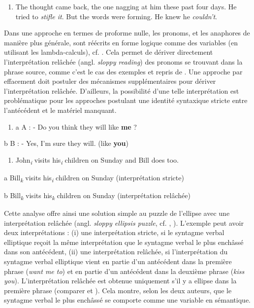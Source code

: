 \begin{enumerate}
\item \label{bkm:Ref305954012}The thought came back, the one nagging at him these past four days. He tried to \textit{stifle it}. But the words were forming. He knew he \textit{couldn't}.  


\end{enumerate}
Dans une approche en termes de proforme nulle, les pronoms, et les anaphores de manière plus générale, sont réécrits en forme logique comme des variables (en utilisant les lambda-calculs), cf. \citet{Williams1977}. Cela permet de dériver directement l'interprétation relâchée (angl. \textit{sloppy reading}) des pronoms se trouvant dans la phrase source, comme c'est le cas des exemples  et  repris de \citet{Winkler2006}. Une approche par effacement doit postuler des mécanismes supplémentaires pour dériver l'interprétation relâchée. D'ailleurs, la possibilité d'une telle interprétation est problématique pour les approches postulant une identité syntaxique stricte entre l'antécédent et le matériel manquant.


\begin{enumerate}
\item \label{bkm:Ref305954986}a  A : - Do you think they will like \textbf{me} ?


\end{enumerate}
  b  B : - Yes, I'm sure they will. (like \textbf{you})  


\begin{enumerate}
\item \label{bkm:Ref305955037}John\textit{\textsubscript{i}} visits his\textit{\textsubscript{i}} children on Sunday and Bill does too.  


\end{enumerate}
a  Bill\textit{\textsubscript{k}} visits his\textit{\textsubscript{i}} children on Sunday (interprétation stricte) 

b    Bill\textit{\textsubscript{k}} visits his\textit{\textsubscript{k}} children on Sunday (interprétation relâchée)

Cette analyse offre ainsi une solution simple au puzzle de l'ellipse avec une interprétation relâchée (angl. \textit{sloppy ellipsis puzzle}, cf. \citet{Hardt1999}, \citet{Schwarz2000}). L'exemple  peut avoir deux interprétations : (i) une interprétation stricte, si le syntagme verbal elliptique reçoit la même interprétation que le syntagme verbal le plus enchâssé dans son antécédent, (ii) une interprétation relâchée, si l'interprétation du syntagme verbal elliptique vient en partie d'un antécédent dans la première phrase (\textit{want me to}) et en partie d'un antécédent dans la deuxième phrase (\textit{kiss you}). L'interprétation relâchée est obtenue uniquement s'il y a ellipse dans la première phrase (comparer  et ). Cela montre, selon les deux auteurs, que le syntagme verbal le plus enchâssé se comporte comme une variable en sémantique. 


